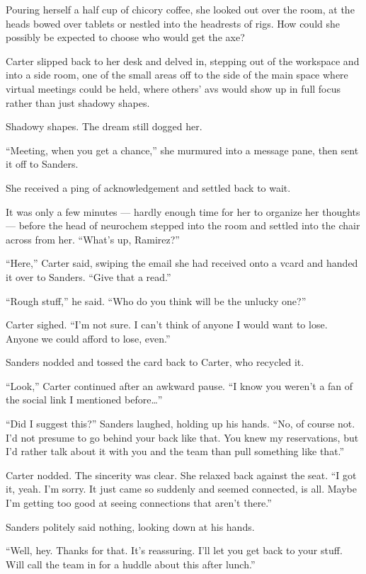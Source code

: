 Pouring herself a half cup of chicory coffee, she looked out over the room, at the heads bowed over tablets or nestled into the headrests of rigs. How could she possibly be expected to choose who would get the axe?

Carter slipped back to her desk and delved in, stepping out of the workspace and into a side room, one of the small areas off to the side of the main space where virtual meetings could be held, where others' avs would show up in full focus rather than just shadowy shapes.

Shadowy shapes. The dream still dogged her.

``Meeting, when you get a chance,'' she murmured into a message pane, then sent it off to Sanders.

She received a ping of acknowledgement and settled back to wait.

It was only a few minutes — hardly enough time for her to organize her thoughts — before the head of neurochem stepped into the room and settled into the chair across from her. ``What's up, Ramirez?''

``Here,'' Carter said, swiping the email she had received onto a vcard and handed it over to Sanders. ``Give that a read.''

``Rough stuff,'' he said. ``Who do you think will be the unlucky one?''

Carter sighed. ``I'm not sure. I can't think of anyone I would want to lose. Anyone we could afford to lose, even.''

Sanders nodded and tossed the card back to Carter, who recycled it.

``Look,'' Carter continued after an awkward pause. ``I know you weren't a fan of the social link I mentioned before\ldots{}''

``Did I suggest this?'' Sanders laughed, holding up his hands. ``No, of course not. I'd not presume to go behind your back like that. You knew my reservations, but I'd rather talk about it with you and the team than pull something like that.''

Carter nodded. The sincerity was clear. She relaxed back against the seat. ``I got it, yeah. I'm sorry. It just came so suddenly and seemed connected, is all. Maybe I'm getting too good at seeing connections that aren't there.''

Sanders politely said nothing, looking down at his hands.

``Well, hey. Thanks for that. It's reassuring. I'll let you get back to your stuff. Will call the team in for a huddle about this after lunch.''

